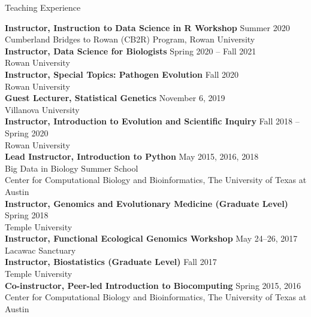 \documentclass{resume} %
\begin{document}
\vspace*{0.5cm}
\begin{rSection}{Teaching Experience}
\vspace*{0.25cm}

\textbf{Instructor, Instruction to Data Science in R Workshop} \hfill Summer 2020 \\ Cumberland Bridges to Rowan (CB2R) Program, Rowan University \\

\textbf{Instructor, Data Science for Biologists} \hfill Spring 2020 -- Fall 2021  \\ Rowan University \\

\textbf{Instructor, Special Topics: Pathogen Evolution} \hfill Fall 2020  \\ Rowan University \\

\textbf{Guest Lecturer, Statistical Genetics} \hfill November 6, 2019 \\ Villanova University \\

\textbf{Instructor, Introduction to Evolution and Scientific Inquiry} \hfill Fall 2018 -- Spring 2020  \\ Rowan University \\

\textbf{Lead Instructor, Introduction to Python} \hfill May 2015, 2016, 2018 \\ Big Data in Biology Summer School \\ Center for Computational Biology and Bioinformatics, The University of Texas at Austin \\

\textbf{Instructor, Genomics and Evolutionary Medicine (Graduate Level)} \hfill Spring 2018 \\ Temple University \\

\textbf{Instructor, Functional Ecological Genomics Workshop} \hfill May 24--26, 2017 \\ Lacawac Sanctuary \\

\textbf{Instructor, Biostatistics (Graduate Level)} \hfill Fall 2017 \\ Temple University \\

\textbf{Co-instructor, Peer-led Introduction to Biocomputing} \hfill Spring 2015, 2016 \\ Center for Computational Biology and Bioinformatics, The University of Texas at Austin \\


\end{rSection}
\end{document}
